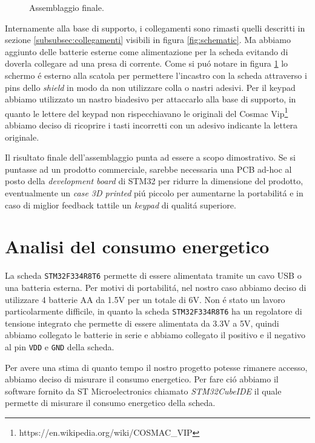 \documentclass[a4paper]{article}
\begin{document}
\begin{figure}[h!t]
\begin{center}
    \end{center}
    \caption{Assemblaggio finale.}
    \label{fig:assemblaggio}
\end{figure}

Internamente alla base di supporto, i collegamenti sono rimasti quelli descritti in sezione \ref{subsubsec:collegamenti} visibili in figura \ref{fig:schematic}. Ma abbiamo aggiunto delle batterie esterne come alimentazione per la scheda evitando di doverla collegare ad una presa di corrente. Come si pu\'o notare in figura \ref{fig:assemblaggio} lo schermo \'e esterno alla scatola per permettere l'incastro con la scheda attraverso i pins dello \textit{shield} in modo da non utilizzare colla o nastri adesivi. Per il keypad abbiamo utilizzato un nastro biadesivo per attaccarlo alla base di supporto, in quanto le lettere del keypad non rispecchiavano le originali del Cosmac Vip\footnote{https://en.wikipedia.org/wiki/COSMAC\_VIP} abbiamo deciso di ricoprire i tasti incorretti con un adesivo indicante la lettera originale.

Il risultato finale dell'assemblaggio punta ad essere a scopo dimostrativo. Se si puntasse ad un prodotto commerciale, sarebbe necessaria una PCB ad-hoc al posto della \textit{development board} di STM32 per ridurre la dimensione del prodotto, eventualmente un \textit{case 3D printed} pi\'u piccolo per aumentarne la portabilit\'a e in caso di miglior feedback tattile un \textit{keypad} di qualit\'a superiore.

\section{Analisi del consumo energetico}

La scheda \texttt{STM32F334R8T6} permette di essere alimentata tramite un cavo USB o una batteria esterna. Per motivi di portabilit\'a, nel nostro caso abbiamo deciso di utilizzare 4 batterie AA da 1.5V per un totale di 6V. Non \'e stato un lavoro particolarmente difficile, in quanto la scheda \texttt{STM32F334R8T6} ha un regolatore di tensione integrato che permette di essere alimentata da 3.3V a 5V, quindi abbiamo collegato le batterie in serie e abbiamo collegato il positivo e il negativo al pin \texttt{VDD} e \texttt{GND} della scheda.

Per avere una stima di quanto tempo il nostro progetto potesse rimanere accesso, abbiamo deciso di misurare il consumo energetico. Per fare ci\'o abbiamo il software fornito da ST Microelectronics chiamato \textit{STM32CubeIDE} il quale permette di misurare il consumo energetico della scheda.
\end{document}
